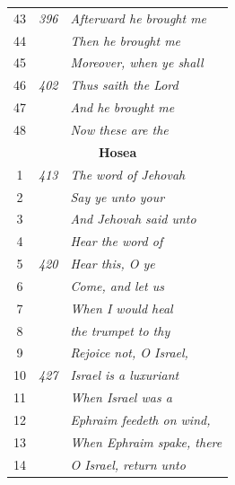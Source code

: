 \documentclass{article}
\newlength{\minipageheight}
\newlength{\minipagewidth}
\begin{document}
\begin{flushright}
\begin{minipage}[r][\minipageheight][t]{\minipagewidth}
\begin{longtable}{ccl}
            43          & \textit{396} & \textit{Afterward he brought me}    \\
            44          &              & \textit{Then he brought me}         \\
            45          &              & \textit{Moreover, when ye shall}    \\
            46          & \textit{402} & \textit{Thus saith the Lord}        \\
            47          &              & \textit{And he brought me}          \\
            48          &              & \textit{Now these are the}          \\

            \multicolumn{3}{c}{\textbf{Hosea}}                               \\
            \hline
            1           & \textit{413} & \textit{The word of Jehovah}        \\
            2           &              & \textit{Say ye unto your}           \\
            3           &              & \textit{And Jehovah said unto}      \\
            4           &              & \textit{Hear the word of}           \\
            5           & \textit{420} & \textit{Hear this, O ye}            \\
            6           &              & \textit{Come, and let us}           \\
            7           &              & \textit{When I would heal}          \\
            8           &              & \textit{the trumpet to thy}         \\
            9           &              & \textit{Rejoice not, O Israel,}     \\
            10          & \textit{427} & \textit{Israel is a luxuriant}      \\
            11          &              & \textit{When Israel was a}          \\
            12          &              & \textit{Ephraim feedeth on wind,}   \\
            13          &              & \textit{When Ephraim spake, there}  \\
            14          &              & \textit{O Israel, return unto}      \\


\end{longtable}
\end{minipage}
\end{flushright}
\end{document}
